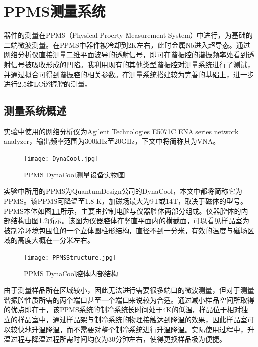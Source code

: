 
        \chapter{PPMS测量系统} %
        \label{cha:PPMS测量系统}
            器件的测量在PPMS（Physical Proerty Measurement System）中进行，为基础的二端微波测量。在PPMS中器件被冷却到2K左右，此时金属Nb进入超导态。通过网络分析仪直接测量二维平面波导的透射信号，即可在谐振腔的谐振频率处看到透射信号被吸收形成的凹陷。我利用现有的其他类型谐振腔对测量系统进行了测试，并通过拟合可得到谐振腔的相关参数。在测量系统搭建较为完善的基础上，进一步进行2.5维LC谐振腔的测量。

            \section{测量系统概述} %
            \label{sec:测量系统概述}

            实验中使用的网络分析仪为Agilent Technologies E5071C ENA series network analyzer，输出频率范围为300kHz至20GHz，下文中将简称其为VNA。


        \begin{figure}[h]
                \centering
            \texttt{[image: DynaCool.jpg]}
            \caption{PPMS DynaCool测量设备实物图\cite{QDDynaCool}}
            \label{fig:DynaCool}
        \end{figure}

            实验中所用的PPMS为QuantumDesign公司的DynaCool\cite{QDDynaCool}，本文中都将简称它为PPMS。该PPMS可降温至1.8 K，加磁场最大为9T或14T，取决于磁体的型号。PPMS本体如图\ref{fig:DynaCool}所示，主要由控制电脑与仪器腔体两部分组成。仪器腔体的内部结构由图\ref{fig:DynaCoolStructure}所示。该图为仪器腔体在竖直平面内的横截面，可以看见样品室为被制冷环境包围住的一个立体圆柱形结构，直径不到一分米，有效的温度与磁场区域的高度大概在一分米左右。


        \begin{figure}[h]
                \centering
            \texttt{[image: PPMSStructure.jpg]}
            \caption{PPMS DynaCool腔体内部结构\cite{QDDynaCool}}
            \label{fig:DynaCoolStructure}
        \end{figure}

            由于测量样品所在区域较小，因此无法进行需要很多端口的微波测量，但对于测量谐振腔性质所需的两个端口甚至一个端口来说较为合适。通过减小样品空间所取得的优点即在于，该PPMS系统的制冷系统长时间处于4K的低温，样品位于相对独立的样品室中，通过样品架与制冷系统的物理接触达到降温的效果，因此样品室可以较快地升温降温，而不需要对整个制冷系统进行升温降温。实际使用过程中，升温过程与降温过程所需时间均仅为30分钟左右，使得更换样品极为便捷。



